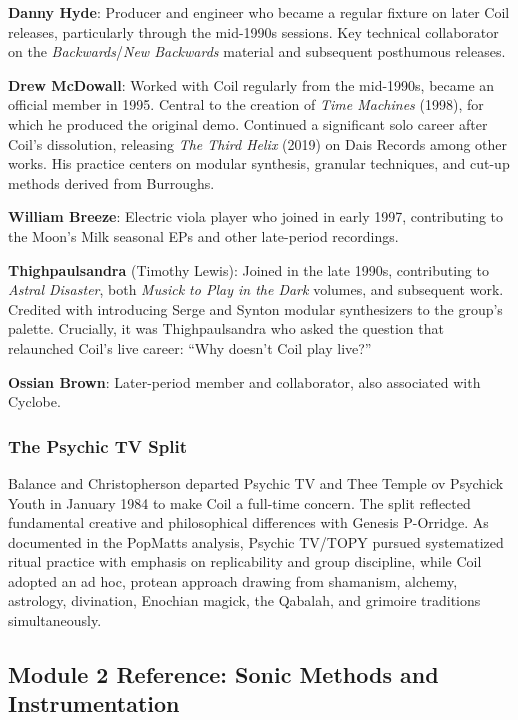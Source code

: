 \documentclass[11pt,letterpaper]{article}
\begin{document}
\textbf{Danny Hyde}: Producer and engineer who became a regular fixture on later Coil releases, particularly through the mid-1990s sessions. Key technical collaborator on the \textit{Backwards}/\textit{New Backwards} material and subsequent posthumous releases.

\textbf{Drew McDowall}: Worked with Coil regularly from the mid-1990s, became an official member in 1995. Central to the creation of \textit{Time Machines} (1998), for which he produced the original demo. Continued a significant solo career after Coil's dissolution, releasing \textit{The Third Helix} (2019) on Dais Records among other works. His practice centers on modular synthesis, granular techniques, and cut-up methods derived from Burroughs.

\textbf{William Breeze}: Electric viola player who joined in early 1997, contributing to the Moon's Milk seasonal EPs and other late-period recordings.

\textbf{Thighpaulsandra} (Timothy Lewis): Joined in the late 1990s, contributing to \textit{Astral Disaster}, both \textit{Musick to Play in the Dark} volumes, and subsequent work. Credited with introducing Serge and Synton modular synthesizers to the group's palette. Crucially, it was Thighpaulsandra who asked the question that relaunched Coil's live career: ``Why doesn't Coil play live?''

\textbf{Ossian Brown}: Later-period member and collaborator, also associated with Cyclobe.

\subsubsection{The Psychic TV Split}

Balance and Christopherson departed Psychic TV and Thee Temple ov Psychick Youth in January 1984 to make Coil a full-time concern. The split reflected fundamental creative and philosophical differences with Genesis P-Orridge. As documented in the PopMatts analysis, Psychic TV/TOPY pursued systematized ritual practice with emphasis on replicability and group discipline, while Coil adopted an ad hoc, protean approach drawing from shamanism, alchemy, astrology, divination, Enochian magick, the Qabalah, and grimoire traditions simultaneously.

\subsection{Module 2 Reference: Sonic Methods and Instrumentation}
\end{document}
